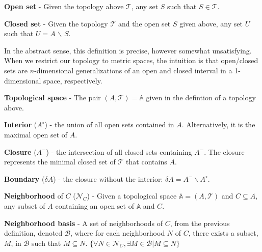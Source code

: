 \begin{defn}
  \textbf{Open set} - Given the topology above $\mathcal{T}$, any set $S$ such
  that $S \in \mathcal{T}$.
\end{defn}

\begin{defn}
  \textbf{Closed set} - Given the topology $\mathcal{T}$ and the open set $S$
  given above, any set $U$ such that $U = A$ $\backslash$ $S$.
\end{defn}

In the abstract sense, this definition is precise, however somewhat unsatisfying.
%
When we restrict our topology to metric spaces, the intuition is that open/closed sets are $n$-dimensional generalizations of an open and closed interval in a 1-dimensional space, respectively.

\begin{defn}
  \textbf{Topological space} - The pair $(A,\mathcal{T}) = \mathbb{A}$ given in
  the defintion of a topology above.
\end{defn}

\begin{defn}
  \textbf{Interior} ($A^{\circ}$) - the union of all open sets
  contained in $A$. Alternatively, it is the maximal open set of $A$.
\end{defn}
\begin{defn}
  \textbf{Closure} ($A^{-}$) - the intersection of all closed sets containing
  $A^{-}$. The closure represents the minimal closed set of $\mathcal{T}$ that
  contains $A$.
\end{defn}
\begin{defn}
  \textbf{Boundary} ($\delta A$) - the closure without the interior:
  $\delta A = A^{-} \backslash A^{\circ}$.
\end{defn}

\begin{defn}
  \textbf{Neighborhood} of $C$ ($\mathcal{N}_C$) - Given a topological space
  $\mathbb{A}=(A,\mathcal{T})$ and $C \subseteq A$, any subset of $A$ containing
  an open set of $\mathbb{A}$ and $C$.
\end{defn}

\begin{defn}
  \textbf{Neighborhood basis} - A set of neighborhoods of $C$,
  from the previous definition, denoted $\mathcal{B}$, where for each
  neighborhood $N$ of $C$, there exists a subset, $M$, in $\mathcal{B}$ such
  that $M \subseteq N$.
  $\{\forall N \in \mathcal{N}_C, \exists M \in \mathcal{B} | M \subseteq N\}$
\end{defn}

